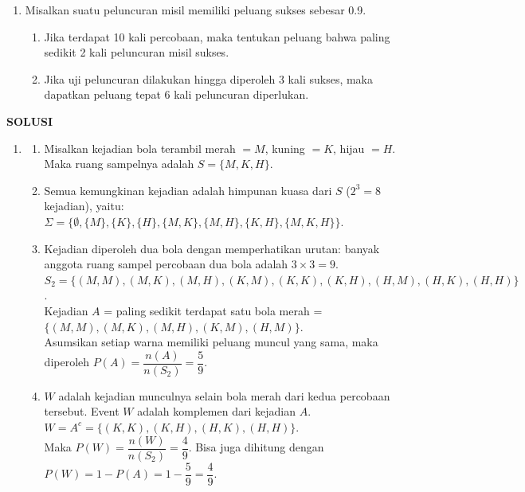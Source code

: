 \documentclass[11pt,letterpaper]{article}
\begin{document}
\begin{enumerate}
  \item Misalkan suatu peluncuran misil memiliki peluang sukses sebesar 0.9.
        \begin{enumerate}[label=\alph*.]
          \item Jika terdapat 10 kali percobaan, maka tentukan peluang bahwa paling sedikit 2 kali peluncuran misil sukses.
          \item Jika uji peluncuran dilakukan hingga diperoleh 3 kali sukses, maka dapatkan peluang tepat 6 kali peluncuran diperlukan.
        \end{enumerate}
\end{enumerate}
\newpage
\begin{center}
  \textbf{SOLUSI}
\end{center}
\begin{enumerate}
  \item \begin{enumerate}[label=\alph*.]
          \item Misalkan kejadian bola terambil merah $= M$, kuning $= K$, hijau $= H$. \\
                Maka ruang sampelnya adalah $S = \{M, K, H\}$.
          \item Semua kemungkinan kejadian adalah himpunan kuasa dari $S$ ($2^3=8$ kejadian), yaitu: \\
                $\Sigma = \{\emptyset, \{M\}, \{K\}, \{H\}, \{M, K\}, \{M, H\}, \{K, H\}, \{M, K, H\}\}$.
          \item Kejadian diperoleh dua bola dengan memperhatikan urutan: banyak anggota ruang sampel percobaan dua bola adalah $3 \times 3 = 9$. \\
                $S_2 = \{(M,M), (M,K), (M,H), (K,M), (K,K), (K,H), (H,M), (H,K), (H,H)\}$. \\
                Kejadian $A$ = paling sedikit terdapat satu bola merah = $\{(M,M), (M,K), (M,H), (K,M), (H,M)\}$. \\
                Asumsikan setiap warna memiliki peluang muncul yang sama, maka diperoleh $P(A) = \dfrac{n(A)}{n(S_2)} = \dfrac{5}{9}$.
          \item $W$ adalah kejadian munculnya selain bola merah dari kedua percobaan tersebut. Event $W$ adalah komplemen dari kejadian $A$. \\
                $W = A^c = \{(K,K), (K,H), (H,K), (H,H)\}$. \\
                Maka $P(W) = \dfrac{n(W)}{n(S_2)} = \dfrac{4}{9}$. Bisa juga dihitung dengan $P(W) = 1 - P(A) = 1 - \dfrac{5}{9} = \dfrac{4}{9}$.
        \end{enumerate}
        \vspace{0.3cm}


\end{enumerate}
\end{document}
